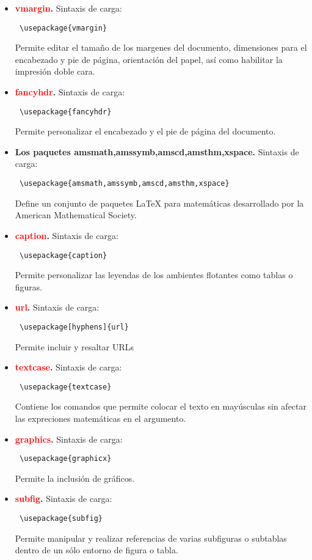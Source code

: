 \begin{itemize}
\item \textbf{\textcolor{red}{vmargin}.}  Sintaxis de carga:  \begin{verbatim} \usepackage{vmargin}
\end{verbatim} Permite editar el tamaño de los margenes del documento, dimensiones para el encabezado y pie de página, orientación del papel, así como habilitar la impresión doble cara. 
\item \textbf{\textcolor{red}{fancyhdr}.}  Sintaxis de carga:  \begin{verbatim} \usepackage{fancyhdr}
\end{verbatim} Permite personalizar el encabezado y el pie de página del documento.
\item \textbf{ Los paquetes amsmath,amssymb,amscd,amsthm,xspace.}  Sintaxis de carga:  \begin{verbatim} \usepackage{amsmath,amssymb,amscd,amsthm,xspace}
\end{verbatim} Define un conjunto de paquetes \LaTeX{} para matemáticas desarrollado por la American Mathematical Society.
\item \textbf{\textcolor{red}{caption}.}  Sintaxis de carga:  \begin{verbatim} \usepackage{caption} 
\end{verbatim} Permite personalizar las leyendas de los ambientes flotantes como tablas o figuras.
\item \textbf{\textcolor{red}{url}.}  Sintaxis de carga:  \begin{verbatim} \usepackage[hyphens]{url}
\end{verbatim} Permite incluir y resaltar URLs
\item \textbf{\textcolor{red}{textcase}.}  Sintaxis de carga:  \begin{verbatim} \usepackage{textcase}
\end{verbatim} Contiene los comandos que permite colocar el texto en may\'{u}sculas sin afectar las expreciones matem\'{a}ticas en el argumento.
\item \textbf{\textcolor{red}{graphics}.}  Sintaxis de carga:  \begin{verbatim} \usepackage{graphicx}
\end{verbatim} Permite la inclusión de gráficos. 
\item \textbf{\textcolor{red}{subfig}.}  Sintaxis de carga:  \begin{verbatim} \usepackage{subfig}
\end{verbatim} Permite manipular y realizar referencias de varias subfiguras o subtablas dentro de un sólo entorno de figura o tabla.

\end{itemize}
